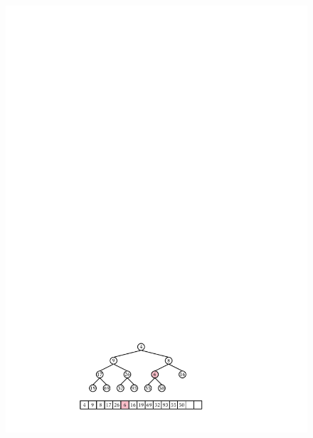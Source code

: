 \begin{figure}
\begin{center}
    \includegraphics[height=\QuarterHeightScaleIfNeeded]{figs/heap-insert-3} \\

\end{center}
\end{figure}
